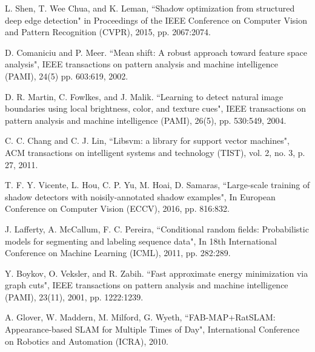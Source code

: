 \documentclass[letterpaper, 10 pt, conference]{ieeeconf}
\begin{document}
\begin{thebibliography}{99}
 L. Shen, T. Wee Chua, and K. Leman, ``Shadow optimization from
structured deep edge detection" in Proceedings of the IEEE Conference
on Computer Vision and Pattern Recognition (CVPR), 2015, pp. 2067:2074.

 D. Comaniciu and P. Meer. ``Mean shift: A robust approach
toward feature space analysis", IEEE transactions on pattern
analysis and machine intelligence (PAMI), 24(5) pp. 603:619, 2002.

 D. R. Martin, C. Fowlkes, and J. Malik. ``Learning to detect natural image boundaries using local brightness, color, and texture cues", IEEE transactions on pattern
analysis and machine intelligence (PAMI), 26(5), pp. 530:549, 2004.

 C. C. Chang and C. J. Lin, ``Libsvm: a library for support vector machines", ACM transactions on intelligent systems and technology (TIST), vol. 2, no. 3, p. 27, 2011.

 T. F. Y. Vicente, L. Hou, C. P. Yu, M. Hoai, D. Samaras, ``Large-scale training of shadow detectors with noisily-annotated shadow examples", In European Conference on Computer Vision (ECCV), 2016, pp. 816:832.

 J. Lafferty, A. McCallum, F. C. Pereira, ``Conditional random fields: Probabilistic models for segmenting and labeling sequence data", In 18th International Conference on Machine Learning (ICML), 2011, pp. 282:289.

 Y. Boykov, O. Veksler, and R. Zabih. ``Fast approximate energy
minimization via graph cuts", IEEE transactions on pattern
analysis and machine intelligence (PAMI), 23(11), 2001, pp. 1222:1239.

 A. Glover, W. Maddern, M. Milford, G. Wyeth, ``FAB-MAP+RatSLAM: Appearance-based SLAM for Multiple Times of Day", International Conference on Robotics and Automation (ICRA), 2010.




\end{thebibliography}
\end{document}
